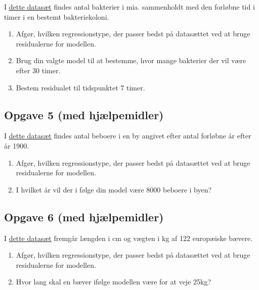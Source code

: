I \href{https://github.com/ChristianJLex/TeachingNotes/raw/master/2023-2024/Data%20og%20lign/bakterierResidual.xlsx}{\color{blue!60} dette datasæt} findes antal bakterier i mia. sammenholdt med den forløbne tid i timer i en bestemt bakteriekoloni. 

\begin{enumerate}[label=\roman*)]
	\item Afgør, hvilken regressionstype, der passer bedst på datasættet ved at bruge 
	residualerne for modellen.
	\item Brug din valgte model til at bestemme, hvor mange bakterier der vil være efter 30 
	timer.
	\item Bestem residualet til tidspunktet 7 timer. 
\end{enumerate}

\subsection*{Opgave 5 (med hjælpemidler)}

I \href{https://github.com/ChristianJLex/TeachingNotes/raw/master/2023-2024/Data%20og%20lign/beboereResidual.xlsx}{\color{blue!60} dette datasæt} findes antal beboere i en by angivet efter antal forløbne år efter år 1900.

\begin{enumerate}[label=\roman*)]
	\item Afgør, hvilken regressionstype, der passer bedst på datasættet ved at bruge 
	residualerne for modellen.
	\item I hvilket år vil der i følge din model være 8000 beboere i byen?
\end{enumerate}

\subsection*{Opgave 6 (med hjælpemidler)}

I \href{https://github.com/ChristianJLex/TeachingNotes/raw/master/2023-2024/Data og lign/Baevervaegt.xlsx}{\color{blue!60} dette datasæt} fremgår længden i cm og vægten i kg af 122 europæiske bævere. 

\begin{enumerate}[label=\roman*)]
	\item Afgør, hvilken regressionstype, der passer bedst på datasættet ved at bruge 
	residualerne for modellen.
	\item Hvor lang skal en bæver ifølge modellen være for at veje 25kg?
\end{enumerate}


